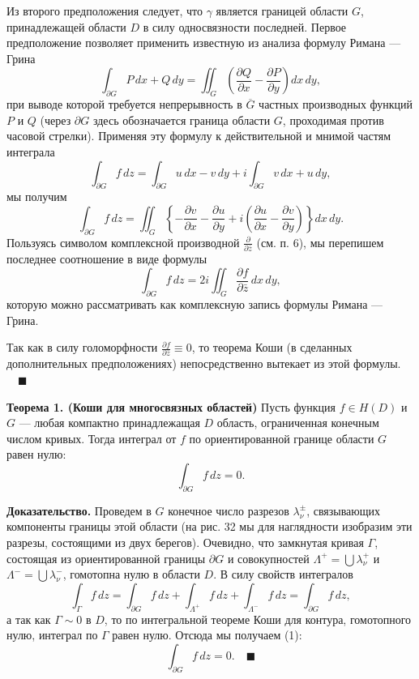 \documentclass[12pt, a4paper]{article}
\theoremstyle{definition}
\theoremstyle{remark}
\begin{document}
Из второго предположения следует, что $\gamma$ является границей области $G$, принадлежащей области $D$ в силу односвязности последней. Первое предположение позволяет применить известную из анализа формулу Римана --- Грина
\begin{equation}
	\int_{\partial G} P \, dx + Q \, dy = \iint_{G} \left( \frac{\partial Q}{\partial x} - \frac{\partial P}{\partial y} \right) dx \, dy,
\end{equation}
при выводе которой требуется непрерывность в $\overline{G}$ частных производных функций $P$ и $Q$ (через $\partial G$ здесь обозначается граница области $G$, проходимая против часовой стрелки). Применяя эту формулу к действительной и мнимой частям интеграла
\[
\int_{\partial G} f \, dz = \int_{\partial G} u \, dx - v \, dy + i \int_{\partial G} v \, dx + u \, dy,
\]
мы получим
\[
\int_{\partial G} f \, dz = \iint_{G} \left\{ -\frac{\partial v}{\partial x} - \frac{\partial u}{\partial y} + i \left( \frac{\partial u}{\partial x} - \frac{\partial v}{\partial y} \right) \right\} dx \, dy.
\]
Пользуясь символом комплексной производной $\frac{\partial}{\partial \bar{z}}$ (см. п. 6), мы перепишем последнее соотношение в виде формулы
\begin{equation}
	\int_{\partial G} f \, dz = 2i \iint_{G} \frac{\partial f}{\partial \bar{z}} \, dx \, dy,
\end{equation}
которую можно рассматривать как комплексную запись формулы Римана --- Грина.

Так как в силу голоморфности $\frac{\partial f}{\partial \bar{z}} \equiv 0$, то теорема Коши (в сделанных дополнительных предположениях) непосредственно вытекает из этой формулы. $\quad \blacksquare$

\textbf{Теорема 1. (Коши для многосвязных областей)} Пусть функция $f \in H(D)$ и $G$ — любая компактно принадлежащая $D$ область, ограниченная конечным числом кривых. Тогда интеграл от $f$ по ориентированной границе области $G$ равен нулю:
\begin{equation}
	\int_{\partial G} f \, dz = 0.
\end{equation}

\textbf{Доказательство.} Проведем в $G$ конечное число разрезов $\lambda_\nu^{\pm}$, связывающих компоненты границы этой области (на рис. 32 мы для наглядности изобразим эти разрезы, состоящими из двух берегов). Очевидно, что замкнутая кривая $\Gamma$, состоящая из ориентированной границы $\partial G$ и совокупностей $\Lambda^+ = \bigcup \lambda_\nu^+$ и $\Lambda^- = \bigcup \lambda_\nu^-$, гомотопна нулю в области $D$. В силу свойств интегралов
\[
\int_{\Gamma} f \, dz = \int_{\partial G} f \, dz + \int_{\Lambda^+} f \, dz + \int_{\Lambda^-} f \, dz = \int_{\partial G} f \, dz,
\]
а так как $\Gamma \sim 0$ в $D$, то по интегральной теореме Коши для контура, гомотопного нулю, интеграл по $\Gamma$ равен нулю. Отсюда мы получаем (1):
\[
\int_{\partial G} f \, dz = 0. \quad \blacksquare
\]
\end{document}
